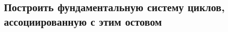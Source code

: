 \documentclass{article}
\begin{document}
        \subsection{Построить фундаментальную систему циклов, ассоциированную с этим остовом}
            \begin{figure}[h!]

\end{figure}
\end{document}
